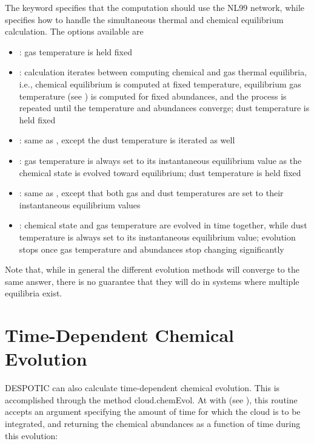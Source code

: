 \documentclass[letterpaper,10pt,english]{sphinxmanual}
\begin{document}
The  keyword specifies that the computation should use the
NL99 network, while  specifies how to handle the
simultaneous thermal and chemical equilibrium calculation. The options
available are
\begin{itemize}
\item {} 
: gas temperature is held fixed

\item {} 
: calculation iterates between computing chemical and
gas thermal equilibria, i.e., chemical equilibrium is computed at
fixed temperature, equilibrium gas temperature (see
{\hyperref[functions:ssec-temp-eq]{\emph{}}}) is computed for fixed abundances, and the
process is repeated until the temperature and abundances converge;
dust temperature is held fixed

\item {} 
: same as , except the dust temperature is
iterated as well

\item {} 
: gas temperature is always set to its instantaneous
equilibrium value as the chemical state is evolved toward
equilibrium; dust temperature is held fixed

\item {} 
: same as , except that both gas and dust
temperatures are set to their instantaneous equilibrium values

\item {} 
: chemical state and gas temperature are evolved in time
together, while dust temperature is always set to its instantaneous
equilibrium value; evolution stops once gas temperature and
abundances stop changing significantly

\end{itemize}

Note that, while in general the different evolution methods will
converge to the same answer, there is no guarantee that they will do
in systems where multiple equilibria exist.


\section{Time-Dependent Chemical Evolution}
\label{functions:ssec-chem-time}\label{functions:time-dependent-chemical-evolution}
DESPOTIC can also calculate time-dependent chemical evolution. This is
accomplished through the method cloud.chemEvol. At with
 (see {\hyperref[functions:ssec-temp-evol]{\emph{}}}), this routine accepts
an argument specifying the amount of time for which the cloud is to be
integrated, and returning the chemical abundances as a function of
time during this evolution:
\end{document}
